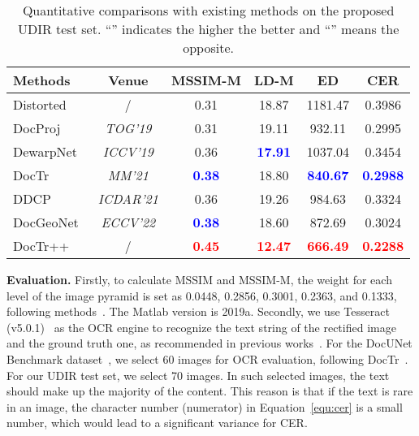\documentclass[lettersize,journal]{IEEEtran}
\begin{document}
\setlength{\tabcolsep}{1.15mm}
\begin{table}[t]
\centering
	\caption{Quantitative comparisons with existing methods on the proposed UDIR test set. ``'' indicates the higher the better and ``'' means the opposite.}
\begin{tabular}{l|c|cccc} 
   \toprule
   \textbf{Methods} & \textbf{Venue} &\textbf{MSSIM-M}  &\textbf{LD-M}   &\textbf{ED}  &\textbf{CER}    \\ 
   \midrule
    Distorted & / & 0.31 & 18.87 & 1181.47 & 0.3986 \\
            \midrule
 
    DocProj~\cite{li2019document} & \emph{TOG'19} &   0.31 & 19.11 & 932.11  &   0.2995 \\

    DewarpNet~\cite{9010747} & \emph{ICCV'19}  &   0.36 & \textcolor{blue}{\textbf{17.91}}  & 1037.04  &  0.3454   \\

    DocTr~\cite{feng2021doctr} & \emph{MM'21} &  \textcolor{blue}{\textbf{0.38}}  & 18.80 & \textcolor{blue}{\textbf{840.67}}    &   \textcolor{blue}{\textbf{0.2988}}  \\  
    
    DDCP~\cite{xie2021document}  & \emph{ICDAR'21} &  0.36 & 19.26 & 984.63  &  0.3324  \\  

    DocGeoNet~\cite{feng2022geometric} & \emph{ECCV'22} &  \textcolor{blue}{\textbf{0.38}} & 18.60 & 872.69  &  0.3024     \\ 

    \midrule
    DocTr++ & / &   \textcolor{red}{\textbf{0.45}}   &   \textcolor{red}{\textbf{12.47}}  
    &  \textcolor{red}{\textbf{666.49}}    &  \textcolor{red}{\textbf{0.2288}}      \\
   \bottomrule
\end{tabular}
\label{tab:t2}
\end{table} 

\smallskip
\textbf{Evaluation.}
Firstly, to calculate MSSIM and MSSIM-M, the weight for each level of the image pyramid is set as 0.0448, 0.2856, 0.3001, 0.2363, and 0.1333, following methods~\cite{feng2021doctr,feng2021docscanner,feng2022geometric}.
The Matlab version is 2019a.
Secondly,
we use Tesseract (v5.0.1)~\cite{4376991} as the OCR engine to recognize the text string of the rectified image and the ground truth one, as recommended in previous works~\cite{feng2021doctr,feng2021docscanner,feng2022geometric}.
For the DocUNet Benchmark dataset~\cite{8578592}, we select 60 images for OCR evaluation, following DocTr~\cite{feng2021doctr}.
For our UDIR test set, we select 70 images.
In such selected images, the text should make up the majority of the content. This reason is that if the text is rare in an image, the character number  (numerator) in Equation~\eqref{equ:cer} is a small number, which would lead to a significant variance for CER.
\end{document}
